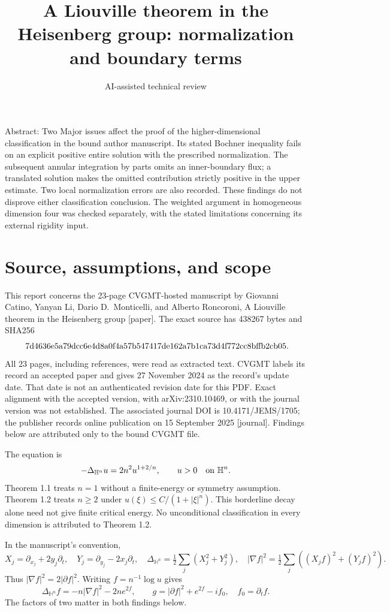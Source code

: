\documentclass[10pt]{article}
\title{A Liouville theorem in the Heisenberg group: normalization and boundary terms}
\author{AI-assisted technical review}
\date{}
\begin{document}
\maketitle
Abstract: Two Major issues affect the proof of the higher-dimensional classification in the bound author manuscript. Its stated Bochner inequality fails on an explicit positive entire solution with the prescribed normalization. The subsequent annular integration by parts omits an inner-boundary flux; a translated solution makes the omitted contribution strictly positive in the upper estimate. Two local normalization errors are also recorded. These findings do not disprove either classification conclusion. The weighted argument in homogeneous dimension four was checked separately, with the stated limitations concerning its external rigidity input.\par
\section*{Source, assumptions, and scope}
This report concerns the 23-page CVGMT-hosted manuscript by Giovanni Catino, Yanyan Li, Dario D. Monticelli, and Alberto Roncoroni, A Liouville theorem in the Heisenberg group [paper]. The exact source has 438267 bytes and SHA256 \[\text{\textnormal{
7d4636e5a79dcc6e4d8a0f4a57b547417de162a7b1ca73d4f772cc8bffb2cb05}}.\] All 23 pages, including references, were read as extracted text. CVGMT labels its record an accepted paper and gives 27 November 2024 as the record’s update date. That date is not an authenticated revision date for this PDF. Exact alignment with the accepted version, with arXiv:2310.10469, or with the journal version was not established. The associated journal DOI is 10.4171/JEMS/1705; the publisher records online publication on 15 September 2025 [journal]. Findings below are attributed only to the bound CVGMT file.\par
The equation is \[-\Delta_{\mathbb H^n}u=2n^2u^{1+2/n},\qquad u>0\quad\hbox{on }\mathbb H^n.\] Theorem 1.1 treats \(n=1\) without a finite-energy or symmetry assumption. Theorem 1.2 treats \(n\geq2\) under \(u(\xi)\leq C/(1+|\xi|^n)\). This borderline decay alone need not give finite critical energy. No unconditional classification in every dimension is attributed to Theorem 1.2.\par
In the manuscript’s convention, \[X_j=\partial_{x_j}+2y_j\partial_t,\quad
 Y_j=\partial_{y_j}-2x_j\partial_t,\quad
 \Delta_{\mathbb H^n}=\tfrac12\sum_j(X_j^2+Y_j^2),\quad
 |\nabla f|^2=\tfrac12\sum_j((X_jf)^2+(Y_jf)^2).\] Thus \(|\nabla f|^2=2|\partial f|^2\). Writing \(f=n^{-1}\log u\) gives \[\Delta_{\mathbb H^n}f=-n|\nabla f|^2-2ne^{2f},\qquad
 g=|\partial f|^2+e^{2f}-if_0,\quad f_0=\partial_tf.\] The factors of two matter in both findings below.\par
\end{document}
